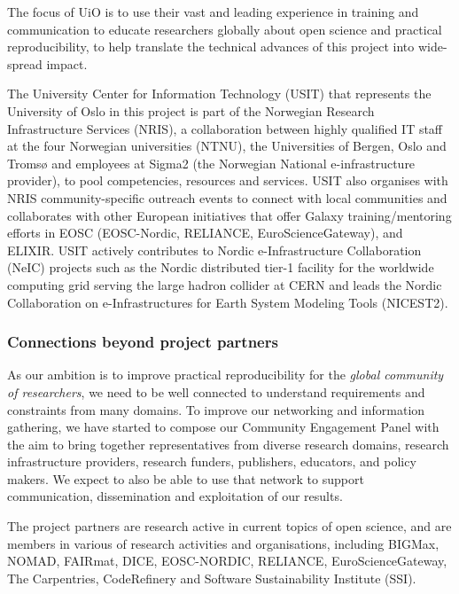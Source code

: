 The focus of UiO is to use their vast and leading experience in training
and communication to educate researchers globally about open science and
practical reproducibility, to help translate the technical advances of this
project into wide-spread impact.

The University Center for Information Technology (USIT) that represents the University of Oslo in this 
project is part of the Norwegian Research Infrastructure Services (NRIS), 
a collaboration between highly qualified IT staff at the four Norwegian universities (NTNU), the 
Universities of Bergen, Oslo and Tromsø and employees at Sigma2 (the Norwegian National e-infrastructure provider),
 to pool competencies, resources and services. USIT also organises with NRIS
 community-specific outreach events to connect with local communities and collaborates with other European 
 initiatives that offer Galaxy training/mentoring efforts in EOSC (EOSC-Nordic, RELIANCE, EuroScienceGateway), 
 and ELIXIR. USIT actively contributes to Nordic e-Infrastructure Collaboration (NeIC) projects such as the Nordic distributed tier-1 facility for the worldwide computing 
 grid serving the large hadron collider at CERN and
 leads the Nordic Collaboration on e-Infrastructures for Earth System Modeling Tools (NICEST2).

\subsubsection{Connections beyond project partners}

As our ambition is to improve practical reproducibility for the \emph{global
  community of researchers}, we need to be well connected to understand
requirements and constraints from many domains. To improve our networking and
information gathering, we have started to compose our Community Engagement Panel
 with the aim to bring together
representatives from diverse research domains, research infrastructure
providers, research funders, publishers, educators, and policy makers. We expect
to also be able to use that network to support communication, dissemination and
exploitation of our results.

The project partners are research active in current topics of open science, and
are members in various of research activities and organisations, including
BIGMax, NOMAD, FAIRmat, DICE, EOSC-NORDIC, RELIANCE, EuroScienceGateway, The Carpentries, 
CodeRefinery and Software Sustainability Institute (SSI).


% 
